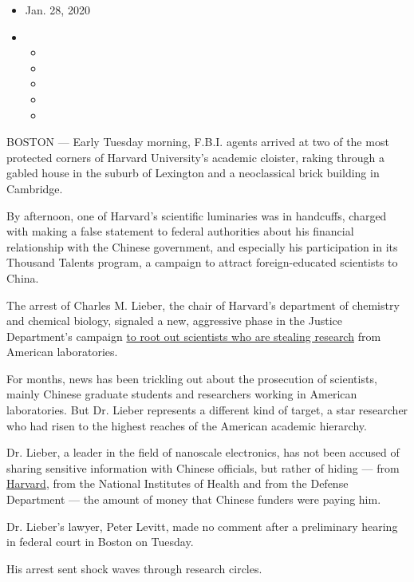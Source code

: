 \begin{itemize}
\item
  Jan. 28, 2020
\item
  \begin{itemize}
  \item
  \item
  \item
  \item
  \item
  \end{itemize}
\end{itemize}

BOSTON --- Early Tuesday morning, F.B.I. agents arrived at two of the
most protected corners of Harvard University's academic cloister, raking
through a gabled house in the suburb of Lexington and a neoclassical
brick building in Cambridge.

By afternoon, one of Harvard's scientific luminaries was in handcuffs,
charged with making a false statement to federal authorities about his
financial relationship with the Chinese government, and especially his
participation in its Thousand Talents program, a campaign to attract
foreign-educated scientists to China.

The arrest of Charles M. Lieber, the chair of Harvard's department of
chemistry and chemical biology, signaled a new, aggressive phase in the
Justice Department's campaign
\href{https://www.nytimes3xbfgragh.onion/2019/11/04/health/china-nih-scientists.html}{to
root out scientists who are stealing research} from American
laboratories.

For months, news has been trickling out about the prosecution of
scientists, mainly Chinese graduate students and researchers working in
American laboratories. But Dr. Lieber represents a different kind of
target, a star researcher who had risen to the highest reaches of the
American academic hierarchy.

Dr. Lieber, a leader in the field of nanoscale electronics, has not been
accused of sharing sensitive information with Chinese officials, but
rather of hiding --- from
\href{https://www.nytimes3xbfgragh.onion/2020/07/15/us/steven-pinker-harvard.html}{Harvard},
from the National Institutes of Health and from the Defense Department
--- the amount of money that Chinese funders were paying him.

Dr. Lieber's lawyer, Peter Levitt, made no comment after a preliminary
hearing in federal court in Boston on Tuesday.

His arrest sent shock waves through research circles.

